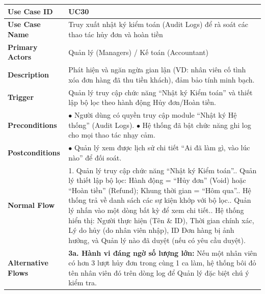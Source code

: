 \begin{longtable}{|L{3.5cm}|L{12.5cm}|}
\hline
\textbf{Use Case ID} & UC30 \\ \hline
\textbf{Use Case Name} & Truy xuất nhật ký kiểm toán (Audit Logs) để rà soát các thao tác hủy đơn và hoàn tiền \\ \hline
\textbf{Primary Actors} & Quản lý (Managers) / Kế toán (Accountant) \\ \hline
\textbf{Description} & Phát hiện và ngăn ngừa gian lận (VD: nhân viên cố tình xóa đơn hàng đã thu tiền khách), đảm bảo tính minh bạch. \\ \hline
\textbf{Trigger} & Quản lý truy cập chức năng ``Nhật ký Kiểm toán'' và thiết lập bộ lọc theo hành động Hủy đơn/Hoàn tiền. \\ \hline
\textbf{Preconditions} &
$\bullet$ Người dùng có quyền truy cập module ``Nhật ký Hệ thống'' (Audit Logs).\newline
$\bullet$ Hệ thống đã bật chức năng ghi log cho mọi thao tác nhạy cảm. \\ \hline
\textbf{Postconditions} & $\bullet$ Quản lý xem được lịch sử chi tiết ``Ai đã làm gì, vào lúc nào'' để đối soát. \\ \hline
\textbf{Normal Flow} &
1. Quản lý truy cập chức năng ``Nhật ký Kiểm toán''.. Quản lý thiết lập bộ lọc: Hành động = ``Hủy đơn'' (Void) hoặc ``Hoàn tiền'' (Refund); Khung thời gian = ``Hôm qua''.. Hệ thống trả về danh sách các sự kiện khớp với bộ lọc.. Quản lý nhấn vào một dòng bất kỳ để xem chi tiết.. Hệ thống hiển thị: Người thực hiện (Tên \& ID), Thời gian chính xác, Lý do hủy (do nhân viên nhập), ID Đơn hàng bị ảnh hưởng, và Quản lý nào đã duyệt (nếu có yêu cầu duyệt). \\ \hline
\textbf{Alternative Flows} &
\textbf{3a. Hành vi đáng ngờ số lượng lớn:} Nếu một nhân viên có hơn 3 lượt hủy đơn trong cùng 1 ca làm, hệ thống bôi đỏ tên nhân viên đó trên dòng log để Quản lý đặc biệt chú ý kiểm tra. \\ \hline
\end{longtable}
